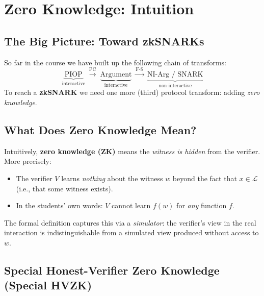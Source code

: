 \documentclass[11pt]{article}
\begin{document}
\section{Zero Knowledge: Intuition}

\subsection{The Big Picture: Toward zkSNARKs}

So far in the course we have built up the following chain of transforms:
\[
  \underbrace{\text{PIOP}}_{\text{interactive}}
  \;\xrightarrow{\text{PC}}\;
  \underbrace{\text{Argument}}_{\text{interactive}}
  \;\xrightarrow{\text{F-S}}\;
  \underbrace{\text{NI-Arg / SNARK}}_{\text{non-interactive}}
\]
To reach a \textbf{zkSNARK} we need one more (third) protocol transform: adding
\emph{zero knowledge}.

\subsection{What Does Zero Knowledge Mean?}

Intuitively, \textbf{zero knowledge (ZK)} means the \emph{witness is hidden}
from the verifier.  More precisely:

\begin{itemize}
  \item The verifier $V$ learns \emph{nothing} about the witness $w$ beyond the
        fact that $x \in \mathcal{L}$ (i.e., that some witness exists).
  \item In the students' own words: $V$ cannot learn $f(w)$ for \emph{any}
        function $f$.
\end{itemize}

\noindent The formal definition captures this via a \emph{simulator}: the
verifier's view in the real interaction is indistinguishable from a simulated
view produced without access to $w$.

\subsection{Special Honest-Verifier Zero Knowledge (Special HVZK)}
\end{document}
